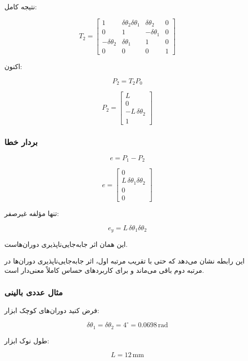 \documentclass{article}
\begin{document}
نتیجه کامل:

\[
T_2 =
\begin{bmatrix}
	1 & \delta\theta_2 \delta\theta_1 & \delta\theta_2 & 0\\
	0 & 1 & -\delta\theta_1 & 0\\
	-\delta\theta_2 & \delta\theta_1 & 1 & 0\\
	0 & 0 & 0 & 1
\end{bmatrix}
\]

اکنون:

\[
P_2 = T_2 P_0
\]

\[
P_2 =
\begin{bmatrix}
	L\\[4pt]
	0\\[4pt]
	-L\,\delta\theta_2\\[4pt]
	1
\end{bmatrix}
\]

\subsubsection{بردار خطا}

\[
e = P_1 - P_2
\]

\[
e =
\begin{bmatrix}
	0\\[4pt]
	L\,\delta\theta_1\delta\theta_2\\[4pt]
	0\\[4pt]
	0
\end{bmatrix}
\]

تنها مؤلفه غیرصفر:

\[
e_y = L\,\delta\theta_1\delta\theta_2
\]

این همان اثر جابه‌جایی‌ناپذیری دوران‌هاست.


این رابطه نشان می‌دهد که حتی با تقریب مرتبه اول، اثر جابه‌جایی‌ناپذیری دوران‌ها در مرتبه دوم باقی می‌ماند و برای کاربردهای حساس کاملاً معنی‌دار است.

\subsubsection{مثال عددی بالینی}

فرض کنید دوران‌های کوچک ابزار:

\[
\delta\theta_1=\delta\theta_2 = 4^\circ = 0.0698\,\text{rad}
\]

طول نوک ابزار:

\[
L = 12\,\text{mm}
\]
\end{document}
